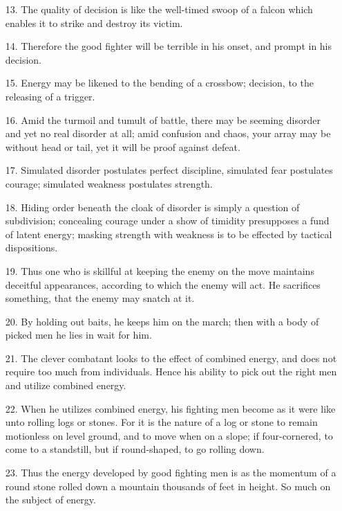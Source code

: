 \documentclass[11pt,openany]{memoir}
\newcommand{\enumeratemargin}{1.30em}
\begin{document}
\begin{enumerate}[leftmargin=\enumeratemargin]
\item[13.] The quality of decision is like the well-timed swoop of a falcon which enables it to strike and destroy its victim.
\item[14.] Therefore the good fighter will be terrible in his onset, and prompt in his decision.
\item[15.] Energy may be likened to the bending of a crossbow; decision, to the releasing of a trigger.
\item[16.] Amid the turmoil and tumult of battle, there may be seeming disorder and yet no real disorder at all; amid confusion and chaos, your array may be without head or tail, yet it will be proof against defeat.
\item[17.] Simulated disorder postulates perfect discipline, simulated fear postulates courage; simulated weakness postulates strength.
\item[18.] Hiding order beneath the cloak of disorder is simply a question of subdivision; concealing courage under a show of timidity presupposes a fund of latent energy; masking strength with weakness is to be effected by tactical dispositions.
\item[19.] Thus one who is skillful at keeping the enemy on the move maintains deceitful appearances, according to which the enemy will act. He sacrifices something, that the enemy may snatch at it.
\item[20.] By holding out baits, he keeps him on the march; then with a body of picked men he lies in wait for him.
\item[21.] The clever combatant looks to the effect of combined energy, and does not require too much from individuals. Hence his ability to pick out the right men and utilize combined energy.
\item[22.] When he utilizes combined energy, his fighting men become as it were like unto rolling logs or stones. For it is the nature of a log or stone to remain motionless on level ground, and to move when on a slope; if four-cornered, to come to a standstill, but if round-shaped, to go rolling down.
\item[23.] Thus the energy developed by good fighting men is as the momentum of a round stone rolled down a mountain thousands of feet in height. So much on the subject of energy.
\end{enumerate}
\end{document}
